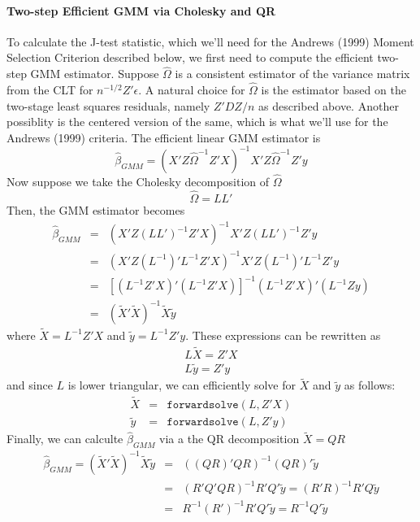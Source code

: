 \documentclass[12pt]{article}
\theoremstyle{definition}
\begin{document}
\paragraph{Two-step Efficient GMM via Cholesky and QR}
To calculate the J-test statistic, which we'll need for the Andrews (1999) Moment Selection Criterion described below, we first need to compute the efficient two-step GMM estimator. Suppose $\widehat{\Omega}$ is a consistent estimator of the variance matrix from the CLT for $n^{-1/2}Z'\epsilon$. A natural choice for $\widehat{\Omega}$ is the estimator based on the two-stage least squares residuals, namely $Z'DZ/n$ as described above. Another possiblity is the centered version of the same, which is what we'll use for the Andrews (1999) criteria. The efficient linear GMM estimator is
  $$\widehat{\beta}_{GMM} = \left(X'Z \widehat{\Omega}^{-1} Z'X\right)^{-1}X'Z \widehat{\Omega}^{-1}Z'y$$
Now suppose we take the Cholesky decomposition of $\widehat{\Omega}$  
  $$\widehat{\Omega} = LL'$$
Then, the GMM estimator becomes
  \begin{eqnarray*}
    \widehat{\beta}_{GMM} &=& \left(X'Z \left(LL'\right)^{-1} Z'X\right)^{-1}X'Z \left(LL'\right)^{-1}Z'y\\
      &=&  \left(X'Z (L^{-1})' L^{-1} Z'X\right)^{-1}X'Z (L^{-1})' L^{-1} Z'y\\
      &=&\left[\left(L^{-1}Z' X \right)' \left(L^{-1}Z'X \right)\right]^{-1} \left(L^{-1}Z'X \right)'\left(L^{-1}Z y\right)\\
      &=& (\widetilde{X}'\widetilde{X})^{-1} \widetilde{X}\widetilde{y}
  \end{eqnarray*}
where $\widetilde{X} = L^{-1}Z' X$ and $\widetilde{y} = L^{-1}Z'y$. These expressions can be rewritten as
  \begin{eqnarray*}
    L\widetilde{X} = Z'X \\
    L\widetilde{y} = Z'y
  \end{eqnarray*}
and since $L$ is lower triangular, we can efficiently solve for $\widetilde{X}$ and $\widetilde{y}$ as follows:
  \begin{eqnarray*}
      \widetilde{X} &=& \texttt{forwardsolve}(L, Z'X)\\
      \widetilde{y} &=& \texttt{forwardsolve}(L, Z'y)
  \end{eqnarray*}
Finally, we can calculte $\widehat{\beta}_{GMM}$ via a the QR decomposition $\widetilde{X}=QR$
\begin{eqnarray*}
   \widehat{\beta}_{GMM} = (\widetilde{X}'\widetilde{X})^{-1} \widetilde{X}\widetilde{y}&=& \left((QR)'QR\right)^{-1}(QR)'\widetilde{y}\\
    &=& (R'Q'QR)^{-1}R'Q'\widetilde{y} =  (R'R)^{-1}R'Q \widetilde{y}\\
    &=&  R^{-1} (R')^{-1}R'Q'\widetilde{y} = R^{-1}Q'\widetilde{y}
\end{eqnarray*}
\end{document}
